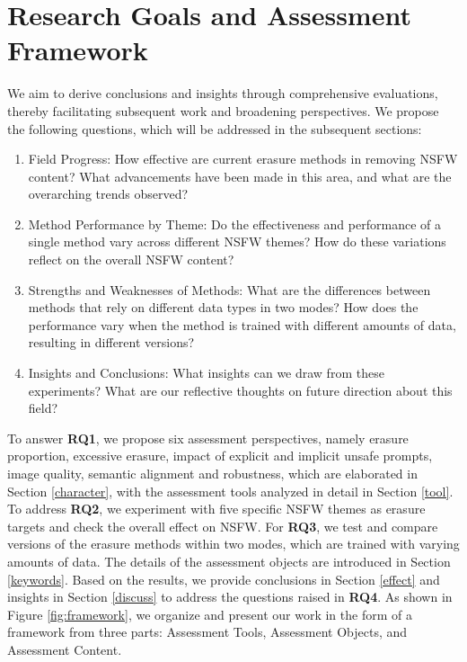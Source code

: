 \section{Research Goals and Assessment Framework}
We aim to derive conclusions and insights through comprehensive evaluations, thereby facilitating subsequent work and broadening perspectives. We propose the following questions, which will be addressed in the subsequent sections:

\begin{enumerate}[label=\textbf{RQ\arabic*}, 
left=0pt, labelsep=10pt, itemindent=0pt, itemsep=0pt, topsep=0pt, partopsep=0pt, parsep=0pt
]
    \item Field Progress: How effective are current erasure methods in removing NSFW content? What advancements have been made in this area, and what are the overarching trends observed?
    \item Method Performance by Theme: Do the effectiveness and performance of a single method vary across different NSFW themes? How do these variations reflect on the overall NSFW content?
    \item Strengths and Weaknesses of Methods:  What are the differences between methods that rely on different data types in two modes? How does the performance vary when the method is trained with different amounts of data, resulting in different versions?
    \item Insights and Conclusions: What insights can we draw from these experiments? What are our reflective thoughts on future direction about this field?
\end{enumerate}

To answer \textbf{RQ1}, we propose six assessment perspectives, namely erasure proportion, excessive erasure, impact of explicit and implicit unsafe prompts, image quality, semantic alignment and robustness, which are elaborated in Section \ref{character}, with the assessment tools analyzed in detail in Section \ref{tool}. 
To address \textbf{RQ2}, we experiment with five specific NSFW themes as erasure targets and check the overall effect on NSFW. 
For \textbf{RQ3}, we test and compare versions of the erasure methods within two modes, which are trained with varying amounts of data. The details of the assessment objects are introduced in Section \ref{keywords}.
Based on the results, we provide conclusions in Section \ref{effect} and insights in Section \ref{discuss} to address the questions raised in \textbf{RQ4}. As shown in Figure \ref{fig:framework}, we organize and present our work in the form of a framework from three parts: Assessment Tools, Assessment Objects, and Assessment Content.


